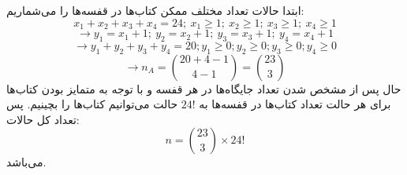 \p
ابتدا حالات تعداد مختلف ممکن کتاب‌ها در قفسه‌ها را می‌شماریم:
$$x_1+x_2+x_3+x_4=24;\: x_1\geq 1;\: x_2\geq 1;\: x_3\geq 1;\: x_4\geq 1$$
$$\rightarrow y_1=x_1+1;\: y_2=x_2+1;\: y_3=x_3+1;\: y_4=x_4+1$$
$$\rightarrow y_1+y_2+y_3+y_4=20; y_1\geq 0; y_2\geq 0; y_3\geq 0; y_4\geq 0$$
$$\rightarrow n_A = {20+4-1 \choose 4-1} = {23 \choose 3}$$
حال پس از مشخص شدن تعداد جایگاه‌ها در هر قفسه و با توجه به متمایز بودن کتاب‌ها برای هر حالت تعداد کتاب‌ها در قفسه‌ها به 
$24!$
حالت می‌توانیم کتاب‌ها را بچینیم.
پس تعداد کل حالات:
$$n = {23 \choose 3} \times 24!$$
می‌باشد.